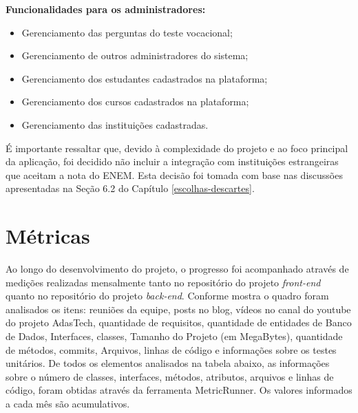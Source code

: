 \textbf{Funcionalidades para os administradores:}  
\begin{itemize}
    \item Gerenciamento das perguntas do teste vocacional;  
    \item Gerenciamento de outros administradores do sistema;  
    \item Gerenciamento dos estudantes cadastrados na plataforma;
    \item Gerenciamento dos cursos cadastrados na plataforma;  
    \item Gerenciamento das instituições cadastradas.  
\end{itemize}

É importante ressaltar que, devido à complexidade do projeto e ao foco principal da aplicação, foi decidido não incluir a integração com instituições estrangeiras que aceitam a nota do ENEM. Esta decisão foi tomada com base nas discussões apresentadas na Seção 6.2 do Capítulo \ref{escolhas-descartes}.  

\newpage

\section{Métricas}

Ao longo do desenvolvimento do projeto, o progresso foi acompanhado através de medições realizadas mensalmente tanto no repositório do projeto \textit{front-end} quanto no repositório do projeto \textit{back-end}. Conforme mostra o quadro foram analisados os itens: reuniões da equipe, posts no blog, vídeos no canal do youtube do projeto AdasTech, quantidade de requisitos, quantidade de entidades de Banco de Dados, Interfaces, classes, Tamanho do Projeto (em MegaBytes), quantidade de métodos, commits, Arquivos, linhas de código e informações sobre os testes unitários. De todos os elementos analisados na tabela abaixo, as informações sobre o número de classes, interfaces, métodos, atributos, arquivos e linhas de código, foram obtidas através da ferramenta MetricRunner. Os valores informados a cada mês são acumulativos.


